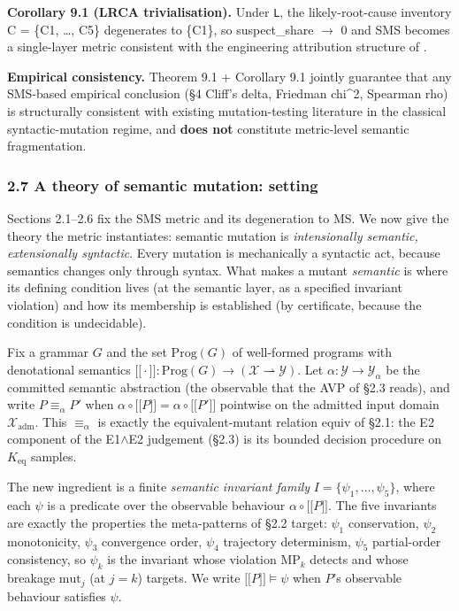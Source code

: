 \documentclass[review,12pt,authoryear]{elsarticle}
\providecommand{\llbracket}{\mathopen{\lbrack\!\lbrack}}
\providecommand{\rrbracket}{\mathclose{\rbrack\!\rbrack}}
\begin{document}
\textbf{Corollary 9.1 (LRCA trivialisation).} Under \texttt{L}, the
likely-root-cause inventory C = \{C1, \ldots, C5\} degenerates to
\{C1\}, so suspect\_share $\to$ 0 and SMS becomes a single-layer metric
consistent with the engineering attribution structure of
\citet{d7c38286734419b52de4262c9802ebdfcf4b9447}.

\textbf{Empirical consistency.} Theorem 9.1 + Corollary 9.1 jointly
guarantee that any SMS-based empirical conclusion (§4 Cliff's delta,
Friedman chi\^{}2, Spearman rho) is structurally consistent with
existing mutation-testing literature in the classical syntactic-mutation
regime, and \textbf{does not} constitute metric-level semantic
fragmentation.


\subsubsection{2.7 A theory of semantic mutation: setting}\label{theory-setting}

Sections 2.1--2.6 fix the SMS metric and its degeneration to MS. We now
give the theory the metric instantiates: semantic mutation is
\emph{intensionally semantic, extensionally syntactic}. Every mutation
is mechanically a syntactic act, because semantics changes only through
syntax. What makes a mutant \emph{semantic} is where its defining
condition lives (at the semantic layer, as a specified invariant
violation) and how its membership is established (by certificate,
because the condition is undecidable).

Fix a grammar $G$ and the set $\mathrm{Prog}(G)$ of well-formed programs
with denotational semantics
$\llbracket\cdot\rrbracket : \mathrm{Prog}(G) \to (\mathcal{X} \rightharpoonup \mathcal{Y})$.
Let $\alpha : \mathcal{Y} \to \mathcal{Y}_\alpha$ be the committed
semantic abstraction (the observable that the AVP of §2.3 reads), and
write $P \equiv_\alpha P'$ when
$\alpha \circ \llbracket P \rrbracket = \alpha \circ \llbracket P' \rrbracket$
pointwise on the admitted input domain $\mathcal{X}_{\mathrm{adm}}$.
This $\equiv_\alpha$ is exactly the equivalent-mutant relation
$\mathrm{equiv}$ of §2.1: the E2 component of the E1$\wedge$E2 judgement
(§2.3) is its bounded decision procedure on $K_{\mathrm{eq}}$ samples.

The new ingredient is a finite \emph{semantic invariant family}
$I = \{\psi_1, \dots, \psi_5\}$, where each $\psi$ is a predicate over
the observable behaviour $\alpha \circ \llbracket P \rrbracket$. The five
invariants are exactly the properties the meta-patterns of §2.2 target:
$\psi_1$ conservation, $\psi_2$ monotonicity, $\psi_3$ convergence order,
$\psi_4$ trajectory determinism, $\psi_5$ partial-order consistency, so
$\psi_k$ is the invariant whose violation MP$_k$ detects and whose
breakage $\mathrm{mut}_j$ (at $j=k$) targets. We write
$\llbracket P \rrbracket \models \psi$ when $P$'s observable behaviour
satisfies $\psi$.
\end{document}
